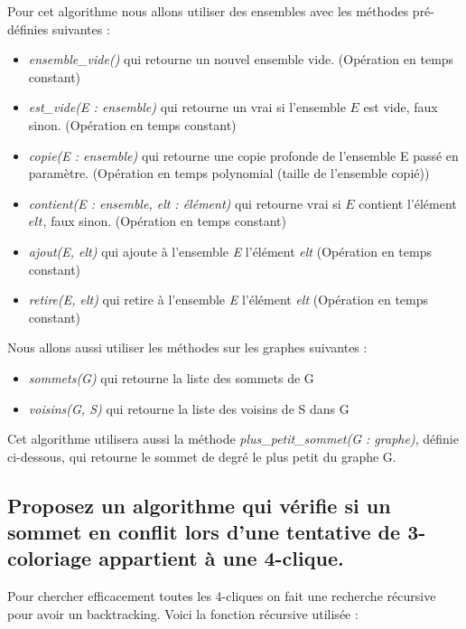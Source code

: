 \documentclass[a4paper, 11pt]{article}
\begin{document}
    Pour cet algorithme nous allons utiliser des ensembles avec les méthodes pré-définies suivantes :
    \begin{itemize}
        \item \emph{ensemble\_vide()} qui retourne un nouvel ensemble vide. (Opération en temps constant)
        \item \emph{est\_vide(E : ensemble)} qui retourne un vrai si l'ensemble $E$ est vide, faux sinon. (Opération en temps constant)
        \item \emph{copie(E : ensemble)} qui retourne une copie profonde de l'ensemble E passé en paramètre. (Opération en temps polynomial (taille de l'ensemble copié))
        \item \emph{contient(E : ensemble, elt : élément)} qui retourne vrai si $E$ contient l'élément $elt$, faux sinon. (Opération en temps constant)
        \item \emph{ajout(E, elt)} qui ajoute à l'ensemble \emph{E} l'élément \emph{elt} (Opération en temps constant)
        \item \emph{retire(E, elt)} qui retire à l'ensemble \emph{E} l'élément \emph{elt} (Opération en temps constant)
    \end{itemize}

    Nous allons aussi utiliser les méthodes sur les graphes suivantes :
    \begin{itemize}
        \item \emph{sommets(G)} qui retourne la liste des sommets de G
        \item \emph{voisins(G, S)} qui retourne la liste des voisins de S dans G
    \end{itemize}

    \bigskip
    Cet algorithme utilisera aussi la méthode \emph{plus\_petit\_sommet(G : graphe)},
    définie ci-dessous, qui retourne le sommet de degré le plus petit du graphe G\@.
    \newpage
    
    

    \subsection{Proposez un algorithme qui vérifie si un sommet en conflit lors d’une tentative de 3-coloriage
    appartient à une 4-clique.}\label{subsec:Q3C}
    Pour chercher efficacement toutes les 4-cliques on fait une recherche récursive pour avoir un backtracking.
    Voici la fonction récursive utilisée :
    
\end{document}
